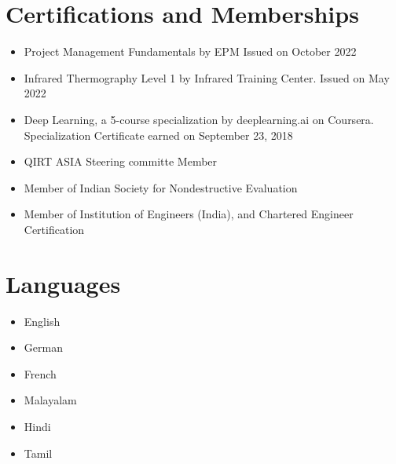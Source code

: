 \documentclass{my_cv}%
\begin{document}
\section{Certifications and Memberships}
\vspace{1em}
\begin{itemize}[leftmargin=0.15in]
\setlength\itemsep{-0.1em}
\color{mygray}
\item[\faCertificate] Project Management Fundamentals by EPM Issued on October 2022
\item[\faCertificate] Infrared Thermography Level 1 by Infrared Training Center. Issued on May 2022
\item[\faCertificate] Deep Learning, a 5-course specialization by deeplearning.ai on Coursera. Specialization Certificate earned on September 23, 2018
\item [\faUsers] QIRT ASIA Steering committe Member
\item [\faUsers] Member of Indian Society for Nondestructive Evaluation
\item [\faUsers] Member of Institution of Engineers (India), and Chartered Engineer Certification
\end{itemize}

\section{Languages}
\vspace{1em}
\noindent
\begin{minipage}{0.4\textwidth}
\begin{itemize}
\setlength\itemsep{0.0em}
\item[] English  \hspace{0.5em}  
\item[] German  \hspace{0.2em}  
\item[] French  \hspace{0.8em} 
\end{itemize}
\end{minipage}
\begin{minipage}{0.4\textwidth}
\begin{itemize}
\setlength\itemsep{0.0em}
\item[] Malayalam  \hspace{0.5em}  
\item[] Hindi      \hspace{2.9em}  
\item[] Tamil      \hspace{2.9em} 
\end{itemize}
\end{minipage}
\vspace{2em}
\end{document}
